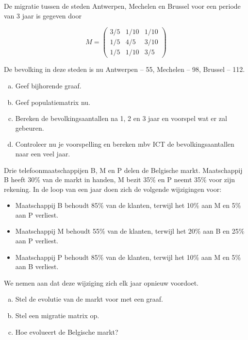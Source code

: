 \documentclass[12pt,twoside]{article}
\begin{document}
\begin{oefening}
De migratie tussen de steden Antwerpen, Mechelen en Brussel  voor een periode van 3 jaar
is gegeven door

$$
M = \begin{pmatrix}
  3/5 & 1/10 & 1/10\\
  1/5 & 4/5  & 3/10\\
  1/5 & 1/10 & 3/5
\end{pmatrix}
$$

De bevolking in deze steden is nu Antwerpen – 55, Mechelen – 98, Brussel – 112.

\begin{enumerate}[(a)]
  \item Geef bijhorende graaf.
  \item Geef populatiematrix nu.
  \item Bereken de bevolkingsaantallen na 1, 2 en 3 jaar en voorspel wat er zal gebeuren.
  \item Controleer nu je voorspelling en bereken mbv ICT de bevolkingsaantallen naar een veel jaar.
\end{enumerate}
\end{oefening}

\begin{oefening}%
Drie telefoonmaatschappijen B, M en P delen de Belgische markt. Maatschappij B heeft 30\% van de markt in handen, M bezit 35\% en P neemt 35\% voor zijn rekening. In de loop van een jaar doen zich de volgende wijzigingen voor:
\begin{itemize}
  \item Maatschappij B behoudt 85\% van de klanten, terwijl het 10\% aan M en 5\% aan P verliest.
  \item Maatschappij M behoudt 55\% van de klanten, terwijl het 20\% aan B en 25\% aan P verliest.
  \item Maatschappij P behoudt 85\% van de klanten, terwijl het 10\% aan M en 5\% aan B verliest.
\end{itemize}
We nemen aan dat deze wijziging zich elk jaar opnieuw voordoet.

\begin{enumerate}[(a)]
  \item Stel de evolutie van de markt voor met een graaf.
  \item Stel een migratie matrix op.
  \item Hoe evolueert de Belgische markt?
\end{enumerate}
\end{oefening}
\end{document}
